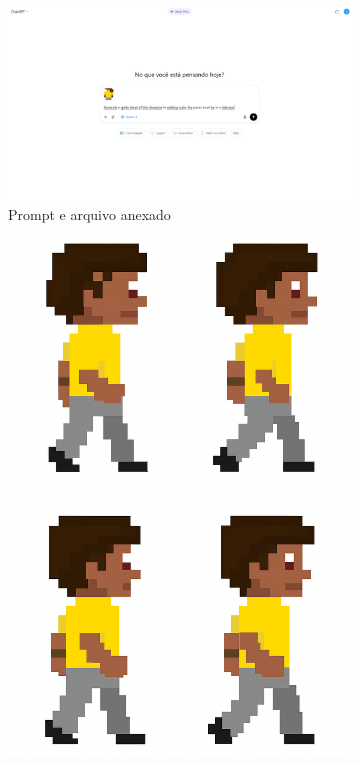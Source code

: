\begin{figure}[htbp]
    \centering
    \caption{\small Processo da utilização do chatGPT em junho/2025}
    \label{fig:chatGPT4}

    \begin{subfigure}{0.75\linewidth}
        \includegraphics[width=1\linewidth]{figs/chatGPT/walking_cycle/front_view/tela.PNG}
        \caption{\small Prompt e arquivo anexado}
        \label{fig:chatGPT4a}
    \end{subfigure}
    \begin{subfigure}{0.2\linewidth}
        \includegraphics[width=1\linewidth]{figs/chatGPT/walking_cycle/front_view/walking cycle 1.png}

\end{subfigure}
\end{figure}
